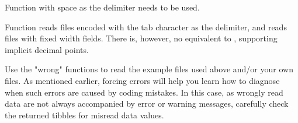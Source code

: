 \documentclass[krantz2]{krantz}\usepackage{knitr}
\begin{document}
\begin{knitrout}\footnotesize
{}\color{fgcolor}\begin{kframe}
\begin{alltt}
\hlstd{(} \hlstd{=} \hlstd{)}
\end{alltt}


{\ttfamily\noindent\bfseries\color{errorcolor}{\#\# Error: 'extdata/not-aligned-ASCII.txt' does not exist in current working directory ('C:/Users/Aphalo/Documents/Own\_manuscripts/Books/learnr-book').}}\end{kframe}
\end{knitrout}

Function  with space as the delimiter needs to be used.

\begin{knitrout}\footnotesize
{}\color{fgcolor}\begin{kframe}
\begin{alltt}
\hlstd{(} \hlstd{=} \hlstd{,}  \hlstd{=} \hlstd{)}
\end{alltt}


{\ttfamily\noindent\bfseries\color{errorcolor}{\#\# Error: 'extdata/not-aligned-ASCII.txt' does not exist in current working directory ('C:/Users/Aphalo/Documents/Own\_manuscripts/Books/learnr-book').}}\end{kframe}
\end{knitrout}

Function  reads files encoded with the tab character as the delimiter, and  reads files with fixed width fields. There is, however, no equivalent to , supporting implicit decimal points.

\begin{playground}
Use the "wrong"  functions to read the example files used above and/or your own files. As mentioned earlier, forcing errors will help you learn how to diagnose when such errors are caused by coding mistakes. In this case, as wrongly read data are not always accompanied by error or warning messages, carefully check the returned tibbles for misread data values.
\end{playground}
\end{document}
